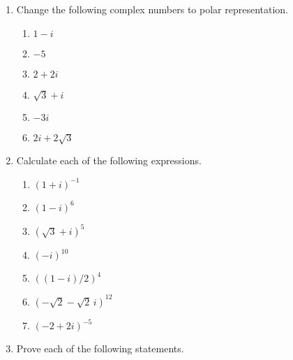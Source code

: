 {\begin{enumerate}
\begin{multicols}{2}
\begin{enumerate}
 \item
$\cis(7\pi/4) /2$
 
\end{enumerate}
\end{multicols}


\item	  %
Change the following complex numbers to polar representation.
\begin{multicols}{3}
\begin{enumerate}
 
 \item
$1-i$

 \item
$-5$
 
 \item
$2+2i$
 
 
\item
$\sqrt{3} + i$

 \item
$-3i$

 \item
$2i + 2 \sqrt{3}$
 
\end{enumerate}
\end{multicols}

 
 
\item %
Calculate each of the following expressions.
\begin{multicols}{2}
\begin{enumerate}
 
 \item
$(1+i)^{-1}$

 \item
$(1 - i)^{6}$
 
 \item
$(\sqrt{3}+i)^{5}$

 \item
$(-i)^{10}$
 
 \item
$((1-i)/2)^{4}$

 \item
$(-\sqrt{2} - \sqrt{2}\, i)^{12}$
 
 \item
$(-2+2i)^{-5}$
 
\end{enumerate}
\end{multicols}

  
  \item
Prove each of the following statements.
\begin{multicols}{2}
\begin{enumerate}
 

\end{enumerate}
\end{multicols}
\end{enumerate}}
